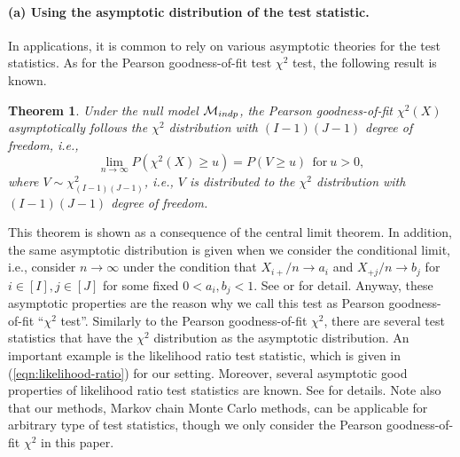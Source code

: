 \documentclass[12pt]{article}
\newtheorem{Theorem}{Theorem}[section]
\theoremstyle{definition}
\begin{document}
\paragraph*{(a) Using the asymptotic distribution of the test statistic.}
In applications, it is common to rely on various asymptotic theories for
the test statistics. As
for the Pearson goodness-of-fit test $\chi^2$ test, the following result
is known.
\begin{Theorem}
Under the null model ${\cal M}_{indp}$, 
 the Pearson goodness-of-fit $\chi^2(X)$ asymptotically follows the $\chi^2$
 distribution with $(I-1)(J-1)$ degree of freedom, i.e.,
\[
 \lim_{n \rightarrow \infty}P(\chi^2(X) \geq u) = P(V \geq u)\ \
 \mbox{for}\ u>0,
\]
where $V \sim \chi^2_{(I-1)(J-1)}$, i.e., $V$ is distributed to the
 $\chi^2$ distribution with $(I-1)(J-1)$ degree of freedom.   
\label{thm:asymptotic-chi^2}
\end{Theorem}
This theorem is shown as a consequence of the central limit theorem. In
addition, the same asymptotic distribution is given when we consider
the conditional limit, i.e., consider $n \rightarrow \infty$ under the
condition that $X_{i+}/n \rightarrow a_{i}$ and $X_{+j}/n \rightarrow
b_j$ for $i \in [I], j \in [J]$ for some fixed $0 < a_i, b_j < 1$. 
See \cite{Cornfield} or \cite{Plackett} for detail.  
Anyway, these asymptotic properties are the reason why we call this test
as Pearson
goodness-of-fit ``$\chi^2$ test''. 
Similarly to the Pearson goodness-of-fit $\chi^2$, there are several
test statistics that have the $\chi^2$ distribution as the asymptotic
distribution. An important example is the likelihood ratio test
statistic, which is given in (\ref{eqn:likelihood-ratio}) for our
setting. Moreover, several asymptotic good properties of likelihood
ratio test statistics are known. See \cite{Lehmann-TSH} for
details. Note also that our methods, Markov chain Monte Carlo methods,
can be applicable for arbitrary type of test statistics, though we only
consider the Pearson goodness-of-fit $\chi^2$ in this paper. 
\end{document}
